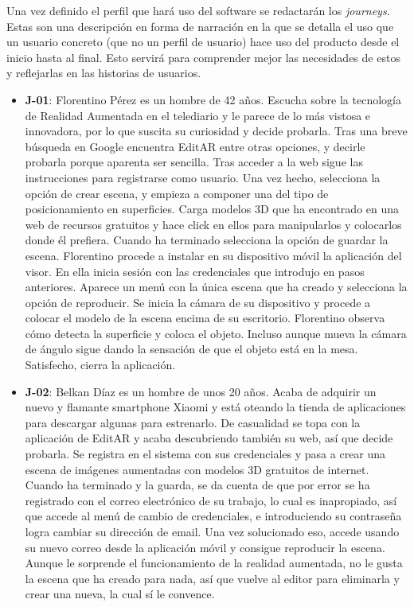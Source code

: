 Una vez definido el perfil que hará uso del software se redactarán los \textit{journeys}. Estas son una descripción en forma de narración en la que se detalla el uso que un usuario concreto (que no un perfil de usuario) hace uso del producto desde el inicio hasta al final. Esto servirá para comprender mejor las necesidades de estos y reflejarlas en las historias de usuarios.

\begin{itemize}
    \item \textbf{J-01}: Florentino Pérez es un hombre de 42 años. Escucha sobre la tecnología de Realidad Aumentada en el telediario y le parece de lo más vistosa e innovadora, por lo que suscita su curiosidad y decide probarla. Tras una breve búsqueda en Google encuentra EditAR entre otras opciones, y decirle probarla porque aparenta ser sencilla. Tras acceder a la web sigue las instrucciones para registrarse como usuario. Una vez hecho, selecciona la opción de crear escena, y empieza a componer una del tipo de posicionamiento en superficies. Carga modelos 3D que ha encontrado en una web de recursos gratuitos y hace click en ellos para manipularlos y colocarlos donde él prefiera. Cuando ha terminado selecciona la opción de guardar la escena. Florentino procede a instalar en su dispositivo móvil la aplicación del visor. En ella inicia sesión con las credenciales que introdujo en pasos anteriores. Aparece un menú con la única escena que ha creado y selecciona la opción de reproducir. Se inicia la cámara de su dispositivo y procede a colocar el modelo de la escena encima de su escritorio. Florentino observa cómo detecta la superficie y coloca el objeto. Incluso aunque mueva la cámara de ángulo sigue dando la sensación de que el objeto está en la mesa. Satisfecho, cierra la aplicación.
    
    \item \textbf{J-02}: Belkan Díaz es un hombre de unos 20 años. Acaba de adquirir un nuevo y flamante smartphone Xiaomi y está oteando la tienda de aplicaciones para descargar algunas para estrenarlo. De casualidad se topa con la aplicación de EditAR y acaba descubriendo también su web, así que decide probarla. Se registra en el sistema con sus credenciales y pasa a crear una escena de imágenes aumentadas con modelos 3D gratuitos de internet. Cuando ha terminado y la guarda, se da cuenta de que por error se ha registrado con el correo electrónico de su trabajo, lo cual es inapropiado, así que accede al menú de cambio de credenciales, e introduciendo su contraseña logra cambiar su dirección de email. Una vez solucionado eso, accede usando su nuevo correo desde la aplicación móvil y consigue reproducir la escena. Aunque le sorprende el funcionamiento de la realidad aumentada, no le gusta la escena que ha creado para nada, así que vuelve al editor para eliminarla y crear una nueva, la cual sí le convence.


\end{itemize}
